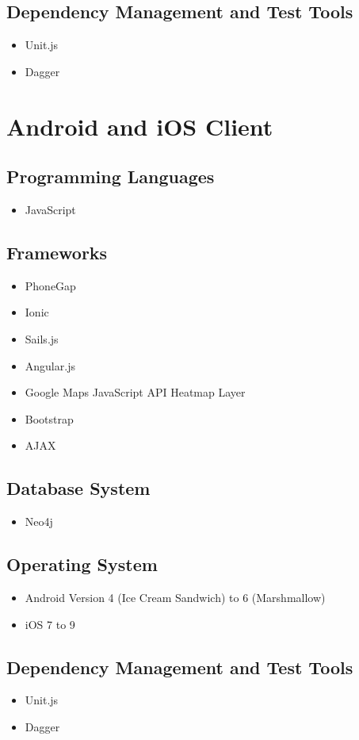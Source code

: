 \documentclass[11pt,fleqn]{book} %
\begin{document}
	\subsection{Dependency Management and Test Tools}
	\begin{itemize}
		\item Unit.js
		\item Dagger
	\end{itemize}
	\section{Android and iOS Client}
	\subsection{Programming Languages}
	\begin{itemize}
		\item JavaScript
	\end{itemize}
	\subsection{Frameworks}
	\begin{itemize}
		\item PhoneGap
		\item Ionic
		\item Sails.js
		\item Angular.js
		\item Google Maps JavaScript API Heatmap Layer
		\item Bootstrap
		\item AJAX					
	\end{itemize}
	\subsection{Database System}
	\begin{itemize}
		\item Neo4j
	\end{itemize}
	\subsection{Operating System}
	\begin{itemize}
		\item Android Version 4 (Ice Cream Sandwich) to 6 (Marshmallow)
		\item iOS 7 to 9				
	\end{itemize}
	\subsection{Dependency Management and Test Tools}
	\begin{itemize}
		\item Unit.js
		\item Dagger
	\end{itemize}
	
\end{document}
